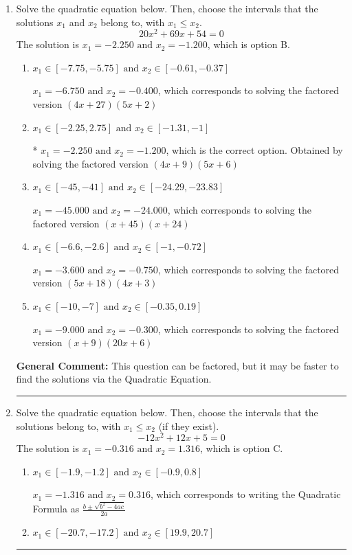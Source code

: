 \documentclass{extbook}[14pt]
\newcommand{\litem}[1]{\item #1

\rule{\textwidth}{0.4pt}}
\begin{document}
\begin{enumerate}\litem{
Solve the quadratic equation below. Then, choose the intervals that the solutions $x_1$ and $x_2$ belong to, with $x_1 \leq x_2$.
\[ 20x^{2} +69 x + 54 = 0 \]The solution is \( x_1 = -2.250 \text{ and } x_2 = -1.200 \), which is option B.\begin{enumerate}[label=\Alph*.]
\item \( x_1 \in [-7.75, -5.75] \text{ and } x_2 \in [-0.61, -0.37] \)

$x_1 = -6.750 \text{ and } x_2 = -0.400$, which corresponds to solving the factored version $(4x + 27)(5x + 2)$
\item \( x_1 \in [-2.25, 2.75] \text{ and } x_2 \in [-1.31, -1] \)

* $x_1 = -2.250 \text{ and } x_2 = -1.200$, which is the correct option. Obtained by solving the factored version $(4x + 9)(5x + 6)$
\item \( x_1 \in [-45, -41] \text{ and } x_2 \in [-24.29, -23.83] \)

$x_1 = -45.000 \text{ and } x_2 = -24.000$, which corresponds to solving the factored version $(x + 45)(x + 24)$
\item \( x_1 \in [-6.6, -2.6] \text{ and } x_2 \in [-1, -0.72] \)

$x_1 = -3.600 \text{ and } x_2 = -0.750$, which corresponds to solving the factored version $(5x + 18)(4x + 3)$
\item \( x_1 \in [-10, -7] \text{ and } x_2 \in [-0.35, 0.19] \)

$x_1 = -9.000 \text{ and } x_2 = -0.300$, which corresponds to solving the factored version $(x + 9)(20x + 6)$
\end{enumerate}

\textbf{General Comment:} This question can be factored, but it may be faster to find the solutions via the Quadratic Equation.
}
\litem{
Solve the quadratic equation below. Then, choose the intervals that the solutions belong to, with $x_1 \leq x_2$ (if they exist).
\[ -12x^{2} +12 x + 5 = 0 \]The solution is \( x_1 = -0.316 \text{ and } x_2 = 1.316 \), which is option C.\begin{enumerate}[label=\Alph*.]
\item \( x_1 \in [-1.9, -1.2] \text{ and } x_2 \in [-0.9, 0.8] \)

 $x_1 = -1.316 \text{ and } x_2 = 0.316$, which corresponds to writing the Quadratic Formula as $\frac{b \pm \sqrt{b^2 - 4ac}}{2a}$
\item \( x_1 \in [-20.7, -17.2] \text{ and } x_2 \in [19.9, 20.7] \)


\end{enumerate}}
\end{enumerate}
\end{document}
